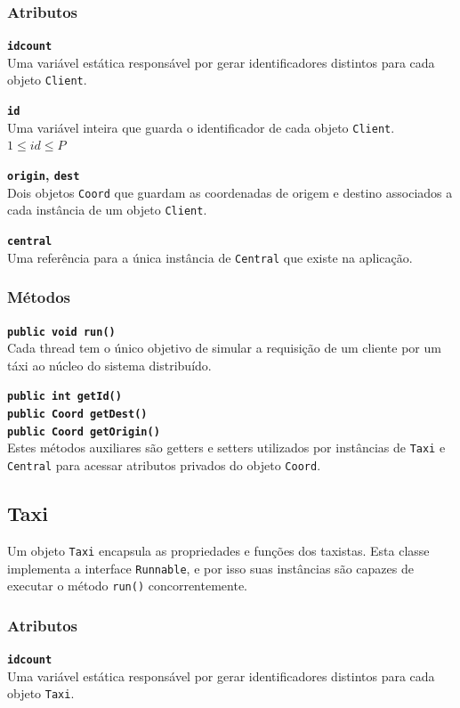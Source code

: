 \documentclass[a4paper,landscape,12pt]{article}
\begin{document}
\subsubsection{Atributos}
\textbf{\texttt{idcount}} \\
Uma variável estática responsável por gerar identificadores distintos para cada objeto \texttt{Client}.

\textbf{\texttt{id}} \\
Uma variável inteira que guarda o identificador de cada objeto \texttt{Client}. \\
$ 1 \leq id \leq P $

\textbf{\texttt{origin}, \texttt{dest}} \\
Dois objetos \texttt{Coord} que guardam as coordenadas de origem e destino associados a cada instância de um objeto \texttt{Client}.

\textbf{\texttt{central}} \\
Uma referência para a única instância de \texttt{Central} que existe na aplicação.

\subsubsection{Métodos}
\textbf{\texttt{public void run()}} \\
Cada thread tem o único objetivo de simular a requisição de um cliente por um táxi ao núcleo do sistema distribuído.

\textbf{\texttt{public int getId() \\
public Coord getDest() \\
public Coord getOrigin()}} \\
Estes métodos auxiliares são getters e setters utilizados por instâncias de \texttt{Taxi} e \texttt{Central} para acessar atributos privados do objeto \texttt{Coord}.

\subsection{Taxi}
Um objeto \texttt{Taxi} encapsula as propriedades e funções dos taxistas. Esta classe implementa a interface \texttt{Runnable}, e por isso suas instâncias são capazes de executar o método \texttt{run()} concorrentemente.

\subsubsection{Atributos}
\textbf{\texttt{idcount}} \\
Uma variável estática responsável por gerar identificadores distintos para cada objeto \texttt{Taxi}.
\end{document}
